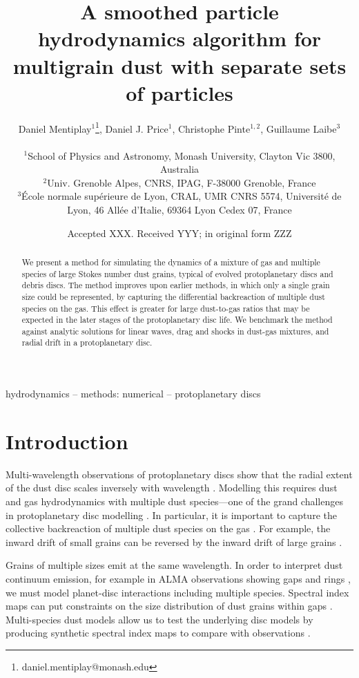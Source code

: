 \documentclass[fleqn,usenatbib]{mnras}
\title[SPH for multigrain dust]{A smoothed particle hydrodynamics algorithm for
multigrain dust with separate sets of particles}
\author[Mentiplay, Price, \& Pinte]{%
   \parbox{\textwidth}{%
      Daniel Mentiplay\(^{1}\)\thanks{daniel.mentiplay@monash.edu},
      Daniel J. Price\(^{1}\),
      Christophe Pinte\(^{1,2}\),
      Guillaume Laibe\(^{3}\)
   }\\
   \(^{1}\)School of Physics and Astronomy, Monash University, Clayton Vic 3800,
   Australia \\
   \(^{2}\)Univ. Grenoble Alpes, CNRS, IPAG, F-38000 Grenoble, France \\
   \(^{3}\)\'{E}cole normale sup\'{e}rieure de Lyon, CRAL, UMR CNRS 5574,
   Universit\'{e} de Lyon, 46 All\'{e}e d’Italie, 69364 Lyon Cedex 07, France
 \\
}
\date{Accepted XXX. Received YYY; in original form ZZZ}
\begin{document}
\label{firstpage}
\pagerange{\pageref{firstpage}--\pageref{lastpage}}
\maketitle

\begin{abstract}
   We present a method for simulating the dynamics of a mixture of gas and
   multiple species of large Stokes number dust grains, typical of evolved
   protoplanetary discs and debris discs. The method improves upon earlier
   methods, in which only a single grain size could be represented, by capturing
   the differential backreaction of multiple dust species on the gas. This
   effect is greater for large dust-to-gas ratios that may be expected in the
   later stages of the protoplanetary disc life. We benchmark the method against
   analytic solutions for linear waves, drag and shocks in dust-gas mixtures,
   and radial drift in a protoplanetary disc.
\end{abstract}

\begin{keywords}
hydrodynamics -- methods: numerical -- protoplanetary discs
\end{keywords}



\section{Introduction}

Multi-wavelength observations of protoplanetary discs show that the radial
extent of the dust disc scales inversely with wavelength
\citep{Andrews2015PASP..127..961A}. Modelling this requires dust and gas
hydrodynamics with multiple dust species---one of the grand challenges in
protoplanetary disc modelling \citep{Haworth2016PASA...33...53H}. In particular,
it is important to capture the collective backreaction of multiple dust species
on the gas \citep{Dipierro2018MNRAS.479.4187D}. For example, the inward drift of
small grains can be reversed by the inward drift of large grains
\citep{Laibe2014MNRAS.444.1940L}.

Grains of multiple sizes emit at the same wavelength. In order to interpret dust
continuum emission, for example in ALMA observations showing gaps and rings
\citep{ALMAPartnership2015ApJ...808L...3A, Andrews2016ApJ...820L..40A}, we must
model planet-disc interactions including multiple species. Spectral index maps
can put constraints on the size distribution of dust grains within gaps
\citep{Huang2018ApJ...852..122H}. Multi-species dust models allow us to test the
underlying disc models by producing synthetic spectral index maps to compare
with observations \citep{Casassus2015ApJ...812..126C, Pinte2016ApJ...816...25P}.
\end{document}
